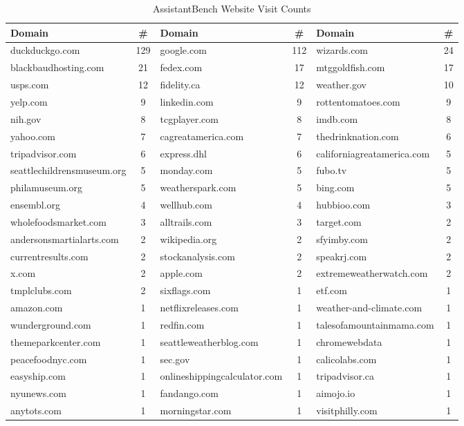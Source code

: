 \documentclass{article} %
\begin{document}
\begin{table}[b]
    \centering
    \scriptsize
    \begin{tabular}{lc lc lc}
        \toprule
        \textbf{Domain} & \textbf{\#} & \textbf{Domain} & \textbf{\#} & \textbf{Domain} & \textbf{\#} \\
        \midrule
        duckduckgo.com & 129 & google.com & 112 & wizards.com & 24 \\
        blackbaudhosting.com & 21 & fedex.com & 17 & mtggoldfish.com & 17 \\
        usps.com & 12 & fidelity.ca & 12 & weather.gov & 10 \\
        yelp.com & 9 & linkedin.com & 9 & rottentomatoes.com & 9 \\
        nih.gov & 8 & tcgplayer.com & 8 & imdb.com & 8 \\
        yahoo.com & 7 & cagreatamerica.com & 7 & thedrinknation.com & 6 \\
        tripadvisor.com & 6 & express.dhl & 6 & californiagreatamerica.com & 5 \\
        seattlechildrensmuseum.org & 5 & monday.com & 5 & fubo.tv & 5 \\
        philamuseum.org & 5 & weatherspark.com & 5 & bing.com & 5 \\
        ensembl.org & 4 & wellhub.com & 4 & hubbioo.com & 3 \\
        wholefoodsmarket.com & 3 & alltrails.com & 3 & target.com & 2 \\
        andersonsmartialarts.com & 2 & wikipedia.org & 2 & sfyimby.com & 2 \\
        currentresults.com & 2 & stockanalysis.com & 2 & speakrj.com & 2 \\
        x.com & 2 & apple.com & 2 & extremeweatherwatch.com & 2 \\
        tmplclubs.com & 2 & sixflags.com & 1 & etf.com & 1 \\
        amazon.com & 1 & netflixreleases.com & 1 & weather-and-climate.com & 1 \\
        wunderground.com & 1 & redfin.com & 1 & talesofamountainmama.com & 1 \\
        themeparkcenter.com & 1 & seattleweatherblog.com & 1 & chromewebdata & 1 \\
        peacefoodnyc.com & 1 & sec.gov & 1 & calicolabs.com & 1 \\
        easyship.com & 1 & onlineshippingcalculator.com & 1 & tripadvisor.ca & 1 \\
        nyunews.com & 1 & fandango.com & 1 & aimojo.io & 1 \\
        anytots.com & 1 & morningstar.com & 1 & visitphilly.com & 1 \\
        \bottomrule
    \end{tabular}
    \caption{\small AssistantBench Website Visit Counts}
    \label{tab:appendix_assistantbench_website_visits}
\end{table}
\end{document}
